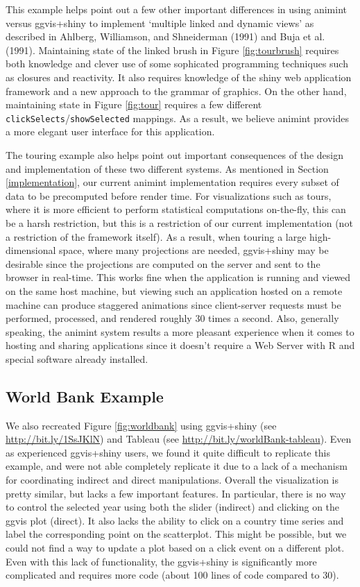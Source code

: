 \documentclass[12pt,]{article}
\theoremstyle{definition}
\theoremstyle{definition}
\theoremstyle{remark}
\begin{document}
This example helps point out a few other important differences in using
animint versus ggvis+shiny to implement `multiple linked and dynamic
views' as described in Ahlberg, Williamson, and Shneiderman (1991) and
Buja et al. (1991). Maintaining state of the linked brush in Figure
\ref{fig:tourbrush} requires both knowledge and clever use of some
sophicated programming techniques such as closures and reactivity. It
also requires knowledge of the shiny web application framework and a new
approach to the grammar of graphics. On the other hand, maintaining
state in Figure \ref{fig:tour} requires a few different
\texttt{clickSelects}/\texttt{showSelected} mappings. As a result, we
believe animint provides a more elegant user interface for this
application.

The touring example also helps point out important consequences of the
design and implementation of these two different systems. As mentioned
in Section \ref{implementation}, our current animint implementation
requires every subset of data to be precomputed before render time. For
visualizations such as tours, where it is more efficient to perform
statistical computations on-the-fly, this can be a harsh restriction,
but this is a restriction of our current implementation (not a
restriction of the framework itself). As a result, when touring a large
high-dimensional space, where many projections are needed, ggvis+shiny
may be desirable since the projections are computed on the server and
sent to the browser in real-time. This works fine when the application
is running and viewed on the same host machine, but viewing such an
application hosted on a remote machine can produce staggered animations
since client-server requests must be performed, processed, and rendered
roughly 30 times a second. Also, generally speaking, the animint system
results a more pleasant experience when it comes to hosting and sharing
applications since it doesn't require a Web Server with R and special
software already installed.

\subsection{World Bank Example}\label{world-bank-example}

We also recreated Figure \ref{fig:worldbank} using ggvis+shiny (see
\url{http://bit.ly/1SsJKlN}) and Tableau (see
\url{http://bit.ly/worldBank-tableau}). Even as experienced ggvis+shiny
users, we found it quite difficult to replicate this example, and were
not able completely replicate it due to a lack of a mechanism for
coordinating indirect and direct manipulations. Overall the
visualization is pretty similar, but lacks a few important features. In
particular, there is no way to control the selected year using both the
slider (indirect) and clicking on the ggvis plot (direct). It also lacks
the ability to click on a country time series and label the
corresponding point on the scatterplot. This might be possible, but we
could not find a way to update a plot based on a click event on a
different plot. Even with this lack of functionality, the ggvis+shiny is
significantly more complicated and requires more code (about 100 lines
of code compared to 30).
\end{document}
